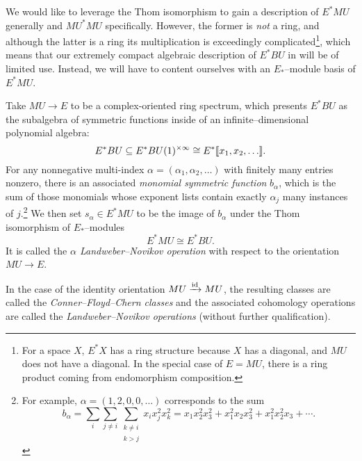 We would like to leverage the Thom isomorphism to gain a description of $E^* MU$ generally and $MU^* MU$ specifically.  However, the former is \emph{not} a ring, and although the latter is a ring its multiplication is exceedingly complicated\footnote{For a space $X$, $E^* X$ has a ring structure because $X$ has a diagonal, and $MU$ does not have a diagonal.  In the special case of $E = MU$, there is a ring product coming from endomorphism composition.}, which means that our extremely compact algebraic description of $E^* BU$ in  will be of limited use.  Instead, we will have to content ourselves with an $E_*$--module basis of $E^* MU$.
\begin{definition}
Take $MU \to E$ to be a complex-oriented ring spectrum, which presents $E^* BU$ as the subalgebra of symmetric functions inside of an infinite--dimensional polynomial algebra: \[E^* BU \subseteq E^* BU(1)^{\times \infty} \cong E^*\llbracket{x_1, x_2, \ldots}\rrbracket.\]  For any nonnegative multi-index $\alpha = (\alpha_1, \alpha_2, \ldots)$ with finitely many entries nonzero, there is an associated \textit{monomial symmetric function} $b_\alpha$, which is the sum of those monomials whose exponent lists contain exactly $\alpha_j$ many instances of $j$.\footnote{For example, $\alpha = (1, 2, 0, 0, \ldots)$ corresponds to the sum \[b_\alpha = \sum_i \sum_{j \ne i} \sum_{\substack{k \ne i \\ k > j}} x_i x_j^2 x_k^2 = x_1 x_2^2 x_3^2 + x_1^2 x_2 x_3^2 + x_1^2 x_2^2 x_3 + \cdots.\]}  We then set $s_\alpha \in E^* MU$ to be the image of $b_\alpha$ under the Thom isomorphism of $E_*$--modules \[E^* MU \cong E^* BU.\]  It is called the \textit{$\alpha${\th} Landweber--Novikov operation} with respect to the orientation $MU \to E$.
\end{definition}

\begin{definition}
In the case of the identity orientation $MU \xrightarrow{\mathrm{id}} MU$, the resulting classes are called the \textit{Conner--Floyd--Chern classes} and the associated cohomology operations are called the \textit{Landweber--Novikov operations} (without further qualification).
\end{definition}

